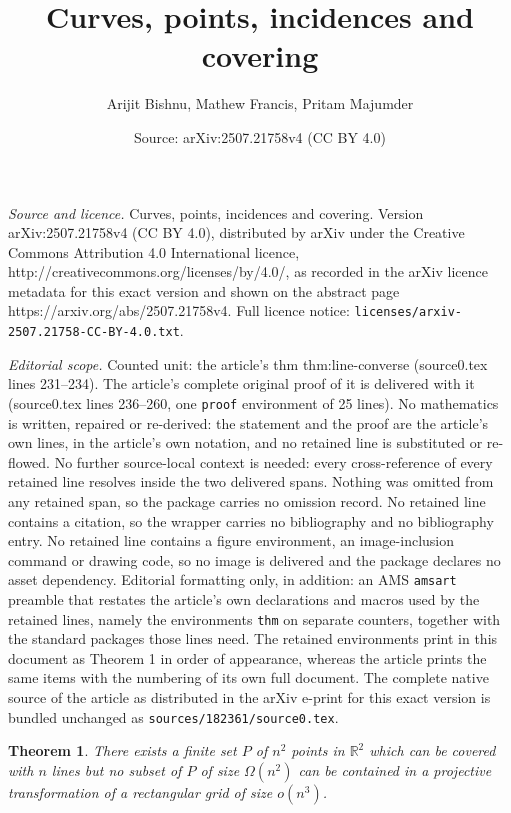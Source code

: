 \documentclass[10pt,a4paper]{amsart}
\title{Curves, points, incidences and covering}
\author{Arijit Bishnu, Mathew Francis, Pritam Majumder}
\date{Source: arXiv:2507.21758v4 (CC BY 4.0)}
\newtheorem{thm}{Theorem}
\begin{document}
\maketitle

\noindent\emph{Source and licence.} Curves, points, incidences and covering. Version arXiv:2507.21758v4 (CC BY 4.0), distributed by arXiv under the Creative Commons Attribution 4.0 International licence, http://creativecommons.org/licenses/by/4.0/, as recorded in the arXiv licence metadata for this exact version and shown on the abstract page https://arxiv.org/abs/2507.21758v4. Full licence notice: \texttt{licenses/arxiv-2507.21758-CC-BY-4.0.txt}.\par\smallskip

\noindent\textit{Editorial scope.} Counted unit: the article's thm thm:line-converse (source0.tex lines 231--234). The article's complete original proof of it is delivered with it (source0.tex lines 236--260, one \texttt{proof} environment of 25 lines). No mathematics is written, repaired or re-derived: the statement and the proof are the article's own lines, in the article's own notation, and no retained line is substituted or re-flowed.  No further source-local context is needed: every cross-reference of every retained line resolves inside the two delivered spans.  Nothing was omitted from any retained span, so the package carries no omission record.  No retained line contains a citation, so the wrapper carries no bibliography and no bibliography entry.  No retained line contains a figure environment, an image-inclusion command or drawing code, so no image is delivered and the package declares no asset dependency.  Editorial formatting only, in addition: an AMS \texttt{amsart} preamble that restates the article's own declarations and macros used by the retained lines, namely the environments \texttt{thm} on separate counters, together with the standard packages those lines need.  The retained environments print in this document as Theorem 1 in order of appearance, whereas the article prints the same items with the numbering of its own full document.  The complete native source of the article as distributed in the arXiv e-print for this exact version is bundled unchanged as \texttt{sources/182361/source0.tex}.
\begin{thm}
	\label{thm:line-converse}
	There exists a finite set $P$ of $n^2$ points in $\mathbb{R}^2$ which can be covered with $n$ lines but no subset of $P$ of size $\Omega (n^2)$ can be contained in a projective transformation of a rectangular grid of size $o(n^3)$.
\end{thm}
\end{document}
